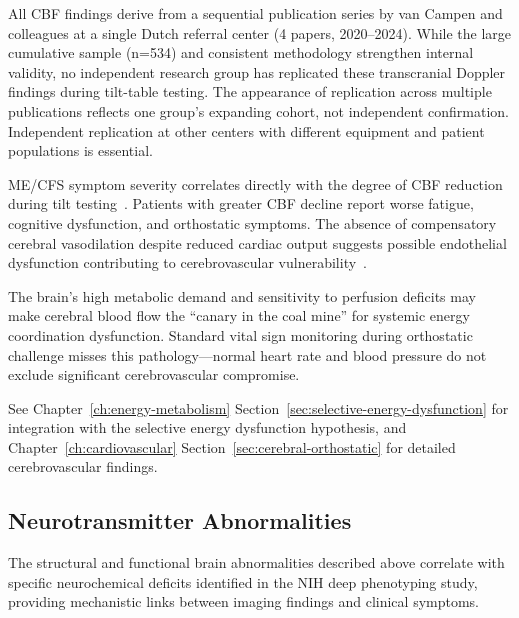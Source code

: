 \begin{warning}
All CBF findings derive from a sequential publication series by van Campen and colleagues at a single Dutch referral center (4 papers, 2020--2024). While the large cumulative sample (n=534) and consistent methodology strengthen internal validity, no independent research group has replicated these transcranial Doppler findings during tilt-table testing. The appearance of replication across multiple publications reflects one group's expanding cohort, not independent confirmation. Independent replication at other centers with different equipment and patient populations is essential.
\end{warning}

\begin{observation}
\label{obs:cbf-symptoms}
ME/CFS symptom severity correlates directly with the degree of CBF reduction during tilt testing~\cite{VanCampenEtAl2023}. Patients with greater CBF decline report worse fatigue, cognitive dysfunction, and orthostatic symptoms. The absence of compensatory cerebral vasodilation despite reduced cardiac output suggests possible endothelial dysfunction contributing to cerebrovascular vulnerability~\cite{VanCampenEtAl2024}.
\end{observation}

The brain's high metabolic demand and sensitivity to perfusion deficits may make cerebral blood flow the ``canary in the coal mine'' for systemic energy coordination dysfunction. Standard vital sign monitoring during orthostatic challenge misses this pathology---normal heart rate and blood pressure do not exclude significant cerebrovascular compromise.

See Chapter~\ref{ch:energy-metabolism} Section~\ref{sec:selective-energy-dysfunction} for integration with the selective energy dysfunction hypothesis, and Chapter~\ref{ch:cardiovascular} Section~\ref{sec:cerebral-orthostatic} for detailed cerebrovascular findings.

\subsection{Neurotransmitter Abnormalities}
\label{sec:neurotransmitters}

The structural and functional brain abnormalities described above correlate with specific neurochemical deficits identified in the NIH deep phenotyping study, providing mechanistic links between imaging findings and clinical symptoms.

